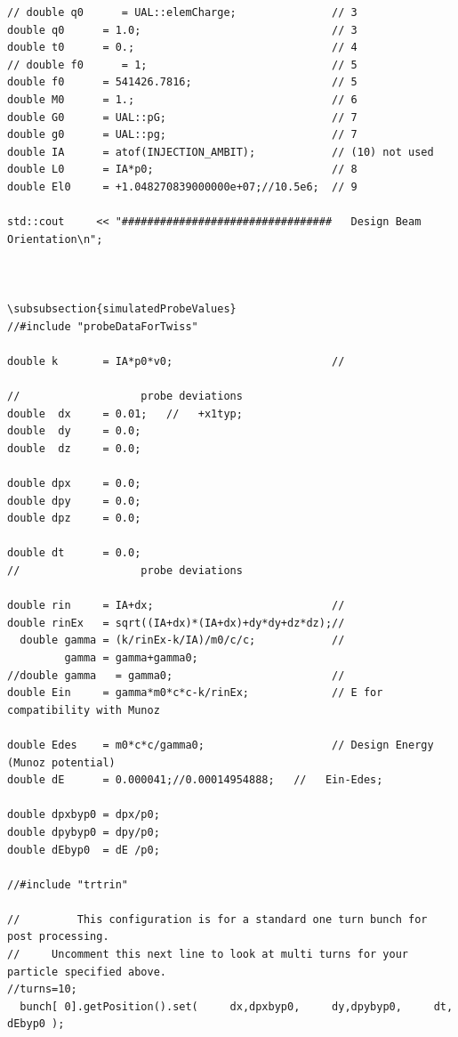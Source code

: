 \documentclass[]{article}
\begin{document}
\begin{verbatim}
// double q0      = UAL::elemCharge;               // 3
double q0      = 1.0;                              // 3
double t0      = 0.;                               // 4
// double f0      = 1;                             // 5
double f0      = 541426.7816;                      // 5
double M0      = 1.;                               // 6
double G0      = UAL::pG;                          // 7
double g0      = UAL::pg;                          // 7
double IA      = atof(INJECTION_AMBIT);            // (10) not used
double L0      = IA*p0;                            // 8
double El0     = +1.048270839000000e+07;//10.5e6;  // 9

std::cout     << "#################################   Design Beam Orientation\n";



\subsubsection{simulatedProbeValues}
//#include "probeDataForTwiss"

double k       = IA*p0*v0;                         //

//                   probe deviations
double  dx     = 0.01;   //   +x1typ;
double  dy     = 0.0;
double  dz     = 0.0; 

double dpx     = 0.0; 
double dpy     = 0.0; 
double dpz     = 0.0; 

double dt      = 0.0; 
//                   probe deviations

double rin     = IA+dx;                            //
double rinEx   = sqrt((IA+dx)*(IA+dx)+dy*dy+dz*dz);//
  double gamma = (k/rinEx-k/IA)/m0/c/c;            //
         gamma = gamma+gamma0;
//double gamma   = gamma0;                         //
double Ein     = gamma*m0*c*c-k/rinEx;             // E for compatibility with Munoz

double Edes    = m0*c*c/gamma0;                    // Design Energy (Munoz potential)
double dE      = 0.000041;//0.00014954888;   //   Ein-Edes; 

double dpxbyp0 = dpx/p0; 
double dpybyp0 = dpy/p0; 
double dEbyp0  = dE /p0;

//#include "trtrin"

//         This configuration is for a standard one turn bunch for post processing.
//     Uncomment this next line to look at multi turns for your particle specified above.
//turns=10;
  bunch[ 0].getPosition().set(     dx,dpxbyp0,     dy,dpybyp0,     dt, dEbyp0 );


\end{verbatim}
\end{document}
